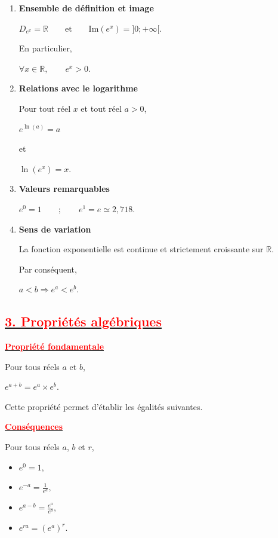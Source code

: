 \documentclass[12pt,a4paper]{article}
\begin{document}
\begin{enumerate}[label=(\alph*)]

\item \textbf{Ensemble de définition et image}

\(
D_{e^x}=\mathbb{R}
\qquad\text{et}\qquad
\mathrm{Im}(e^x)=]0;+\infty[.
\)

En particulier,

\(
\forall x\in\mathbb{R},\qquad e^x>0.
\)

\item \textbf{Relations avec le logarithme}

Pour tout réel \(x\) et tout réel \(a>0\),

\(
e^{\ln(a)}=a
\)

et

\(
\ln(e^x)=x.
\)

\item \textbf{Valeurs remarquables}

\(
e^0=1
\qquad;\qquad
e^1=e\simeq2,718.
\)

\item \textbf{Sens de variation}

La fonction exponentielle est continue et strictement croissante sur \( \mathbb{R} \).

Par conséquent,

\(
a<b
\Longrightarrow
e^a<e^b.
\)

\end{enumerate}

\subsection*{\underline{\textbf{\textcolor{red}{3. Propriétés algébriques}}}}

\underline{\textbf{\textcolor{red}{Propriété fondamentale}}}

Pour tous réels \(a\) et \(b\),

\(
e^{a+b}=e^a\times e^b.
\)

Cette propriété permet d'établir les égalités suivantes.

\underline{\textbf{\textcolor{red}{Conséquences}}}

Pour tous réels \(a\), \(b\) et \(r\),

\begin{itemize}
\item \(
e^0=1,
\)

\item \(
e^{-a}=\frac1{e^a},
\)

\item \(
e^{a-b}=\frac{e^a}{e^b},
\)

\item \(
e^{ra}=(e^a)^r.
\)
\end{itemize}
\end{document}
